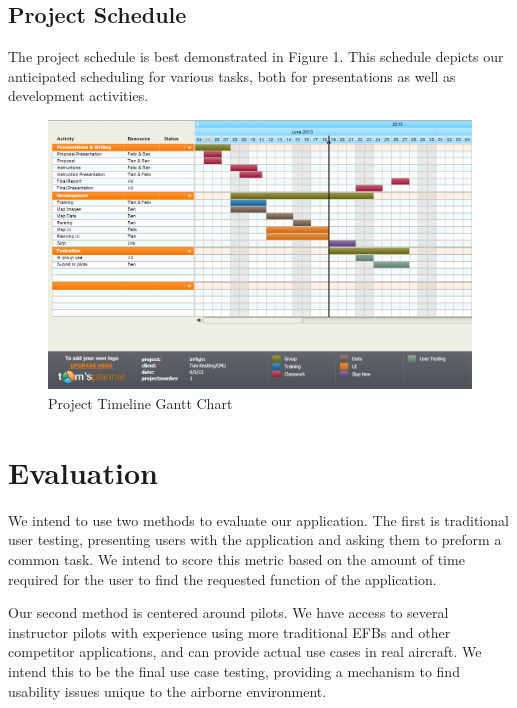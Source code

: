 \documentclass[10pt,a4paper]{article}
\begin{document}
\subsection{Project Schedule}
The project schedule is best demonstrated in Figure 1. This schedule depicts our anticipated scheduling for various tasks, both for presentations as well as development activities.
\begin{figure}[h]
\includegraphics[scale=.4]{gantt}
\caption{Project Timeline Gantt Chart}
\end{figure}
\section{Evaluation}
We intend to use two methods to evaluate our application. The first is traditional user testing, presenting users with the application and asking them to preform a common task. We intend to score this metric based on the amount of time required for the user to find the requested function of the application.

Our second method is centered around pilots. We have access to several instructor pilots with experience using more traditional EFBs and other competitor applications, and can provide actual use cases in real aircraft. We intend this to be the final use case testing, providing a mechanism to find usability issues unique to the airborne environment.
\end{document}
